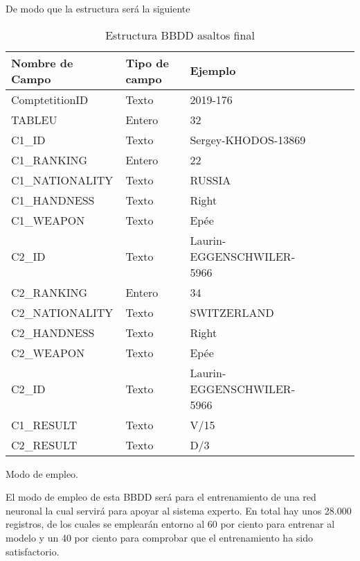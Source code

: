 De modo que la estructura será la siguiente
\begin{table}[htb]%
  \centering
  \caption{Estructura BBDD asaltos final}
  \label{tab:anchura}
  \begin{tabular}{ | l | l | l | l | l | l | }
    \hline
    Nombre de Campo & Tipo de campo & Ejemplo \\ \hline
    ComptetitionID & Texto & 2019-176 \\ \hline
    TABLEU & Entero & 32 \\ \hline
    C1\_ID & Texto & Sergey-KHODOS-13869 \\ \hline
    C1\_RANKING & Entero & 22 \\ \hline
    C1\_NATIONALITY & Texto & RUSSIA \\ \hline
    C1\_HANDNESS & Texto & Right \\ \hline
    C1\_WEAPON & Texto & Epée \\ \hline
    C2\_ID & Texto & Laurin-EGGENSCHWILER-5966 \\ \hline
    C2\_RANKING & Entero & 34 \\ \hline
    C2\_NATIONALITY & Texto & SWITZERLAND \\ \hline
    C2\_HANDNESS & Texto & Right \\ \hline
    C2\_WEAPON & Texto & Epée \\ \hline
    C2\_ID & Texto & Laurin-EGGENSCHWILER-5966 \\ \hline
    C1\_RESULT & Texto & V/15 \\ \hline
    C2\_RESULT & Texto & D/3 \\
    \hline
  \end{tabular}
\end{table}

Modo de empleo.

El modo de empleo de esta BBDD será para el entrenamiento de una red neuronal
 la cual servirá para apoyar al sistema experto. En total hay unos 28.000 registros,
 de los cuales se emplearán entorno al 60 por ciento para entrenar al modelo y un 40
 por ciento para comprobar que el entrenamiento ha sido satisfactorio.
